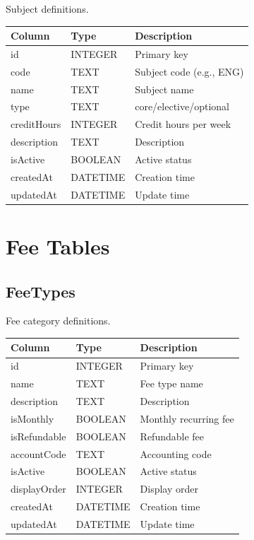 \documentclass[12pt,a4paper]{report}
\begin{document}
Subject definitions.

\begin{longtable}{@{}p{4cm}p{2.5cm}p{6.5cm}@{}}
\toprule
\textbf{Column} & \textbf{Type} & \textbf{Description} \\
\midrule
\endhead
id & INTEGER & Primary key \\
code & TEXT & Subject code (e.g., ENG) \\
name & TEXT & Subject name \\
type & TEXT & core/elective/optional \\
creditHours & INTEGER & Credit hours per week \\
description & TEXT & Description \\
isActive & BOOLEAN & Active status \\
createdAt & DATETIME & Creation time \\
updatedAt & DATETIME & Update time \\
\bottomrule
\end{longtable}

\chapter{Fee Tables}

\section{FeeTypes}

Fee category definitions.

\begin{longtable}{@{}p{4cm}p{2.5cm}p{6.5cm}@{}}
\toprule
\textbf{Column} & \textbf{Type} & \textbf{Description} \\
\midrule
\endhead
id & INTEGER & Primary key \\
name & TEXT & Fee type name \\
description & TEXT & Description \\
isMonthly & BOOLEAN & Monthly recurring fee \\
isRefundable & BOOLEAN & Refundable fee \\
accountCode & TEXT & Accounting code \\
isActive & BOOLEAN & Active status \\
displayOrder & INTEGER & Display order \\
createdAt & DATETIME & Creation time \\
updatedAt & DATETIME & Update time \\
\bottomrule
\end{longtable}
\end{document}
